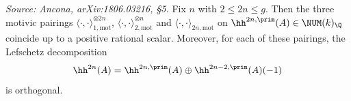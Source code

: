 \begin{lemma}
  \label{lem:lefschetz-pairings}
  \textit{Source: Ancona, arXiv:1806.03216, §5.}
  Fix \(n\) with \(2 \le 2n \le g\). Then the three motivic pairings
  \(\langle \cdot, \cdot \rangle_{1,\mathrm{mot}}^{\otimes 2n}\),
  \(\langle \cdot, \cdot \rangle_{2,\mathrm{mot}}^{\otimes n}\) and
  \(\langle \cdot, \cdot \rangle_{2n,\mathrm{mot}}\) on
  \(\hh^{2n,\prim}(A) \in \NUM(k)_\Q\) coincide up to a positive rational scalar.
  Moreover, for each of these pairings, the Lefschetz decomposition
  \[\hh^{2n}(A) = \hh^{2n,\prim}(A) \oplus \hh^{2n-2,\prim}(A)(-1)\]
  is orthogonal.
\end{lemma}

